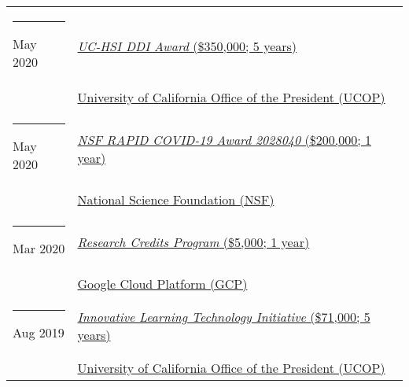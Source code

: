 \documentclass[margin,line]{res}
\begin{document}
\begin{resume}
\begin{longtable}{@{}p{0.7in}p{4in}}
\hspace*{-4mm} \rule{-1mm}{5mm} May 2020 & \href{https://www.ucop.edu/graduate-studies/initiatives-outreach/uc-hsi-ddi.html}{\textit{UC-HSI DDI Award} (\$350,000; 5 years)}\\*
\hspace*{-4mm} \hspace*{-4mm} & \hspace{4mm} \href{https://www.ucop.edu/}{University of California Office of the President (UCOP)}\\
\hspace*{-4mm} \rule{-1mm}{5mm} May 2020 & \href{https://www.nsf.gov/awardsearch/showAward?AWD_ID=2028040}{\textit{NSF RAPID COVID-19 Award 2028040} (\$200,000; 1 year)}\\*
\hspace*{-4mm} \hspace*{-4mm} & \hspace{4mm} \href{https://nsf.gov}{National Science Foundation (NSF)}\\
\hspace*{-4mm} \rule{-1mm}{5mm} Mar 2020 & \href{https://edu.google.com/programs/credits/research/}{\textit{Research Credits Program} (\$5,000; 1 year)}\\*
\hspace*{-4mm} \hspace*{-4mm} & \hspace{4mm} \href{https://cloud.google.com/}{Google Cloud Platform (GCP)}\\
\hspace*{-4mm} \rule{-1mm}{5mm} Aug 2019 & \href{https://www.ucop.edu/innovative-learning-technology-initiative/}{\textit{Innovative Learning Technology Initiative} (\$71,000; 5 years)}\\*
\hspace*{-4mm} \hspace*{-4mm} & \hspace{4mm} \href{https://www.ucop.edu/}{University of California Office of the President (UCOP)}\\
\end{longtable}


\end{resume}
\end{document}
